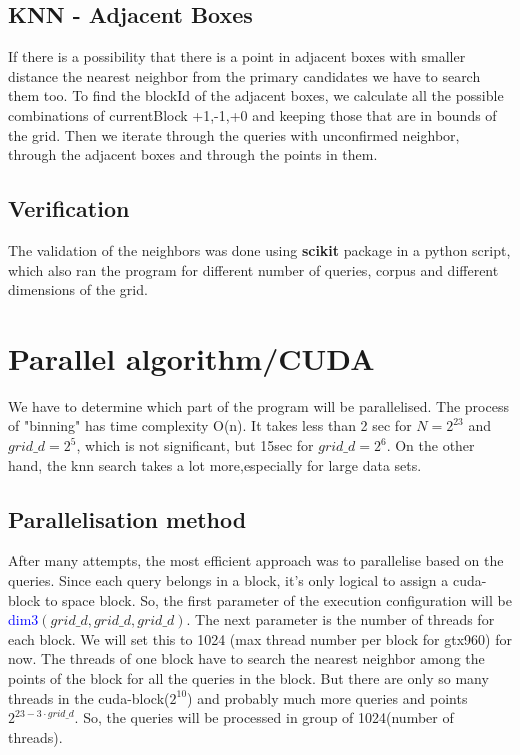 \documentclass[10pt,a4paper]{article}
\begin{document}
\subsection*{KNN - Adjacent Boxes} 
If there is a possibility that there is a point in adjacent boxes with smaller distance the nearest neighbor from the primary candidates we have to search them too. To find the blockId of the adjacent boxes, we calculate all the possible combinations of currentBlock +1,-1,+0 and keeping those that are in bounds of the grid. Then we iterate through the queries with unconfirmed neighbor, through the adjacent boxes and through the points in them.
\subsection*{Verification}
The validation of the neighbors was done using \textbf{scikit} package in a python script, which also ran the program for different number of queries, corpus and different dimensions of the grid.


\section*{Parallel algorithm/CUDA}
We have to determine which part of the program will be parallelised. The process of "binning" has time complexity O(n). It takes less than 2 sec for $N = 2^{23}$ and $grid\_d = 2^5$, which is not significant, but 15sec for $grid\_d = 2^6$. On the other hand, the knn search takes a lot more,especially for large data sets. \\

\subsection*{Parallelisation method}
After many attempts, the most efficient approach was to parallelise based on the queries. Since each query belongs in a block, it's only logical to assign a cuda-block to space block. So, the first parameter of the execution configuration will be \textcolor{blue}{dim3}$(grid\_d,grid\_d,grid\_d)$. The next parameter is the number of threads for each block. We will set this to 1024 (max thread number per block for gtx960) for now. The threads of one block have to search the nearest neighbor among the points of the block for all the queries in the block. But there are only so many threads in the cuda-block($2^{10}$) and probably much more queries and points $2^{23-3\cdot grid\_d}$. So, the queries will be processed in group of 1024(number of threads). \\
\end{document}
